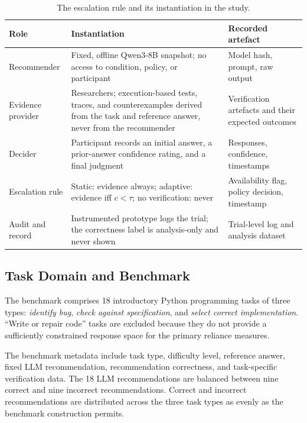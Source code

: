 \documentclass[oneside,final,14pt,a4paper]{extreport}
\begin{document}
\begin{table}[H]
\centering
\caption{The escalation rule and its instantiation in the study.}
\label{tab:escalation}
\small
\begin{tabular}{@{}>{\raggedright\arraybackslash}p{2.6cm}>{\raggedright\arraybackslash}p{7.4cm}>{\raggedright\arraybackslash}p{4.2cm}@{}}
\toprule
Role & Instantiation & Recorded artefact \\
\midrule
Recommender & Fixed, offline Qwen3-8B snapshot; no access to condition,
policy, or participant & Model hash, prompt, raw output \\
Evidence provider & Researchers; execution-based tests, traces, and
counterexamples derived from the task and reference answer, never from the
recommender & Verification artefacts and their expected outcomes \\
Decider & Participant records an initial answer, a prior-answer confidence
rating, and a final judgment & Responses, confidence, timestamps \\
Escalation rule & Static: evidence always; adaptive: evidence iff $c<\tau$;
no verification: never & Availability flag, policy decision, timestamp \\
Audit and record & Instrumented prototype logs the trial; the correctness
label is analysis-only and never shown & Trial-level log and analysis
dataset \\
\bottomrule
\end{tabular}
\end{table}


\subsection{Task Domain and Benchmark}
\label{subsec:answerspace}

The benchmark comprises 18 introductory Python programming tasks 
of three types: \emph{identify bug}, \emph{check against specification}, 
and \emph{select correct implementation}. ``Write or repair code'' 
tasks are excluded because they do not provide a sufficiently constrained 
response space for the primary reliance measures.

The benchmark metadata include task type, difficulty level, reference answer,
fixed LLM recommendation, recommendation correctness, and task-specific
verification data. The 18 LLM recommendations are balanced between nine
correct and nine incorrect recommendations. Correct and incorrect
recommendations are distributed across the three task types as evenly as the
benchmark construction permits.
\end{document}
